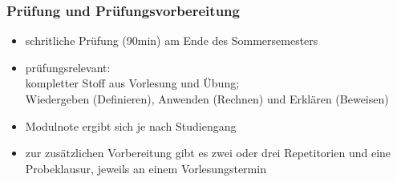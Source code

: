 \documentclass[aspectratio=1610,onlymath]{beamer}
\begin{document}


%


\begin{frame}\frametitle{Prüfung und Prüfungsvorbereitung}
\begin{itemize}
\item schritliche Prüfung (90min) am Ende des Sommersemesters
\item prüfungsrelevant:\\
	kompletter Stoff aus Vorlesung \alert{und} Übung;\\
	Wiedergeben (Definieren), Anwenden (Rechnen) und Erklären (Beweisen)
\item Modulnote ergibt sich je nach Studiengang
\item zur zusätzlichen Vorbereitung gibt es \alert{zwei oder drei Repetitorien} und \alert{eine Probeklausur}, jeweils an einem Vorlesungstermin
\end{itemize}

\end{frame}
\end{document}
